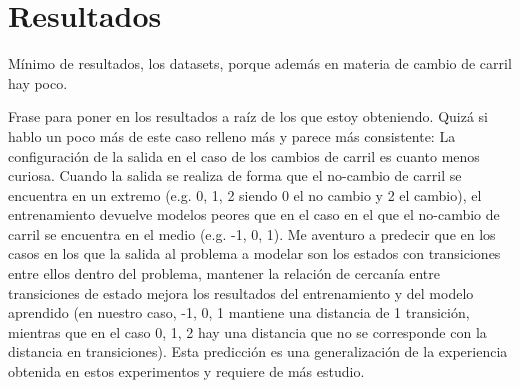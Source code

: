 \chapter{Resultados}
\label{ch:results}

Mínimo de resultados, los datasets, porque además en materia de cambio de carril hay poco.

Frase para poner en los resultados a raíz de los que estoy obteniendo. Quizá si hablo un poco más de este caso relleno más y parece más consistente: La configuración de la salida en el caso de los cambios de carril es cuanto menos curiosa. Cuando la salida se realiza de forma que el no-cambio de carril se encuentra en un extremo (e.g. 0, 1, 2 siendo 0 el no cambio y 2 el cambio), el entrenamiento devuelve modelos peores que en el caso en el que el no-cambio de carril se encuentra en el medio (e.g. -1, 0, 1). Me aventuro a predecir que en los casos en los que la salida al problema a modelar son los estados con transiciones entre ellos dentro del problema, mantener la relación de cercanía entre transiciones de estado mejora los resultados del entrenamiento y del modelo aprendido (en nuestro caso, -1, 0, 1 mantiene una distancia de 1 transición, mientras que en el caso 0, 1, 2 hay una distancia que no se corresponde con la distancia en transiciones). Esta predicción es una generalización de la experiencia obtenida en estos experimentos y requiere de más estudio.